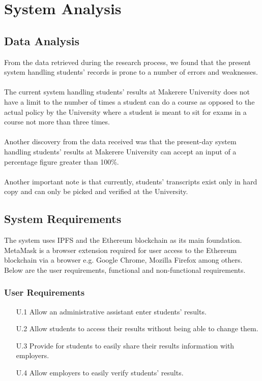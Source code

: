 \section{System Analysis}
\subsection{Data Analysis}
From the data retrieved during the research process, we found that the present system handling students’ records is prone to a number of errors and weaknesses.\\\\
The current system handling students’ results at Makerere University does not have a limit to the number of times a student can do a course as opposed to the actual policy by the University where a student is meant to sit for exams in a course not more than three times.\\\\
Another discovery from the data received was that the present-day system handling students’ results at Makerere University can accept an input of a percentage figure greater than 100\%.\\\\
Another important note is that currently, students' transcripts exist only in hard copy and can only be picked and verified at the University.

\subsection{System Requirements}
The system uses IPFS and the Ethereum blockchain as its main foundation. MetaMask is a browser extension required for user access to the Ethereum blockchain  via a browser e.g. Google Chrome, Mozilla Firefox among others. Below are the user requirements, functional and non-functional requirements.

\subsubsection{User Requirements}
\begin{enumerate}
\item[U.1] Allow an administrative assistant enter students’ results.
\item[U.2] Allow students to access their results without being able to change them.
\item[U.3] Provide for students to easily share their results information with employers.
\item[U.4] Allow employers to easily verify students' results.
\end{enumerate}

